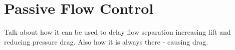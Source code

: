 \section{Passive Flow Control}

Talk about how it can be used to delay flow separation increasing lift and reducing pressure drag.
Also how it is always there - causing drag.